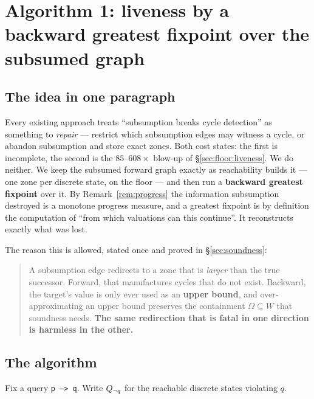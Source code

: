 \section{Algorithm 1: liveness by a backward greatest fixpoint over the subsumed graph}
\label{sec:liveness}

\subsection{The idea in one paragraph}

Every existing approach treats ``subsumption breaks cycle detection'' as something to \emph{repair}
--- restrict which subsumption edges may witness a cycle, or abandon subsumption and store exact
zones. Both cost states: the first is incomplete, the second is the $85$--$608\times$ blow-up of
\S\ref{sec:floor:liveness}. We do neither. We keep the subsumed forward graph exactly as
reachability builds it --- one zone per discrete state, on the floor --- and then run a
\textbf{backward greatest fixpoint} over it. By Remark~\ref{rem:progress} the information
subsumption destroyed is a monotone progress measure, and a greatest fixpoint is by definition the
computation of ``from which valuations can this continue''. It reconstructs exactly what was lost.

The reason this is allowed, stated once and proved in \S\ref{sec:soundness}:

\begin{quote}
A subsumption edge redirects to a zone that is \emph{larger} than the true successor. Forward, that
manufactures cycles that do not exist. Backward, the target's value is only ever used as an
\textbf{upper bound}, and over-approximating an upper bound preserves the containment
$\Omega \subseteq W$ that soundness needs. \textbf{The same redirection that is fatal in one
direction is harmless in the other.}
\end{quote}

\subsection{The algorithm}

Fix a query \texttt{p --> q}. Write $Q_{\lnot q}$ for the reachable discrete states violating
$q$.


